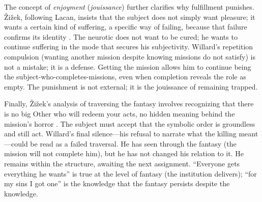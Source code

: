 The concept of \emph{enjoyment} (\emph{jouissance}) further clarifies why fulfillment
punishes. {\v{Z}}i{\v{z}}ek, following Lacan, insists that the subject does not simply want
pleasure; it wants a certain kind of suffering, a specific way of failing, because that failure
confirms its identity \parencite{ZizekSublime1999}. The neurotic does not want to be cured; he
wants to continue suffering in the mode that secures his subjectivity. Willard's repetition
compulsion (wanting another mission despite knowing missions do not satisfy) is not a mistake;
it is a defense. Getting the mission allows him to continue being the subject-who-completes-missions,
even when completion reveals the role as empty. The punishment is not external; it is the
jouissance of remaining trapped.

Finally, {\v{Z}}i{\v{z}}ek's analysis of traversing the fantasy involves recognizing that
there is no big Other who will redeem your acts, no hidden meaning behind the mission's horror
\parencite{ZizekSublime1999}. The subject must accept that the symbolic order is groundless
and still act. Willard's final silence---his refusal to narrate what the killing meant---could
be read as a failed traversal. He has seen through the fantasy (the mission will not complete
him), but he has not changed his relation to it. He remains within the structure, awaiting the
next assignment. ``Everyone gets everything he wants'' is true at the level of fantasy (the
institution delivers); ``for my sins I got one'' is the knowledge that the fantasy persists
despite the knowledge.
